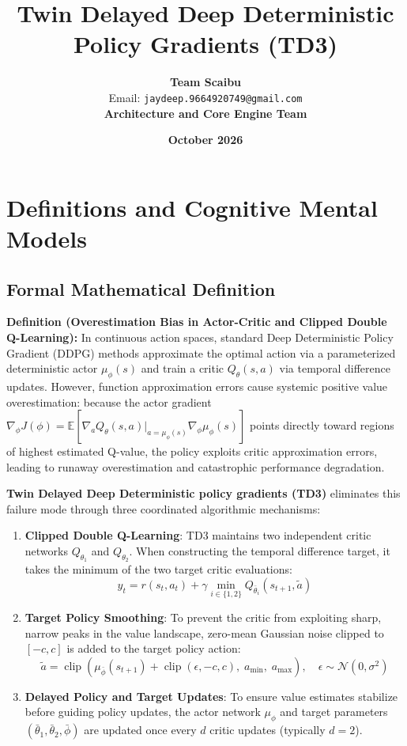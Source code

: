 \documentclass[11pt,a4paper]{article}
\title{\textbf{Twin Delayed Deep Deterministic Policy Gradients (TD3)}}
\author{\textbf{Team Scaibu} \\ \small Email: \texttt{jaydeep.9664920749@gmail.com} \\ \small \textbf{Architecture and Core Engine Team}}
\date{\textbf{October 2026}}
\theoremstyle{definition}
\begin{document}
\maketitle

\section{Definitions and Cognitive Mental Models}

\subsection{Formal Mathematical Definition}
\textbf{Definition (Overestimation Bias in Actor-Critic and Clipped Double Q-Learning):}
In continuous action spaces, standard Deep Deterministic Policy Gradient (DDPG) methods approximate the optimal action via a parameterized deterministic actor $\mu_\phi(s)$ and train a critic $Q_\theta(s, a)$ via temporal difference updates. However, function approximation errors cause systemic positive value overestimation: because the actor gradient $\nabla_\phi J(\phi) = \mathbb{E}[\nabla_a Q_\theta(s, a)|_{a=\mu_\phi(s)} \nabla_\phi \mu_\phi(s)]$ points directly toward regions of highest estimated Q-value, the policy exploits critic approximation errors, leading to runaway overestimation and catastrophic performance degradation.

\textbf{Twin Delayed Deep Deterministic policy gradients (TD3)} eliminates this failure mode through three coordinated algorithmic mechanisms:
\begin{enumerate}
    \item \textbf{Clipped Double Q-Learning}: TD3 maintains two independent critic networks $Q_{\theta_1}$ and $Q_{\theta_2}$. When constructing the temporal difference target, it takes the minimum of the two target critic evaluations:
    {\boldmath
    \begin{equation}
    y_t = r(s_t, a_t) + \gamma \min_{i \in \{1, 2\}} Q_{\bar{\theta}_i}(s_{t+1}, \tilde{a})
    \end{equation}
    }
    \item \textbf{Target Policy Smoothing}: To prevent the critic from exploiting sharp, narrow peaks in the value landscape, zero-mean Gaussian noise clipped to $[-c, c]$ is added to the target policy action:
    {\boldmath
    \begin{equation}
    \tilde{a} = \operatorname{clip}\left( \mu_{\bar{\phi}}(s_{t+1}) + \operatorname{clip}(\epsilon, -c, c), \; a_{\min}, \; a_{\max} \right), \quad \epsilon \sim \mathcal{N}(0, \sigma^2)
    \end{equation}
    }
    \item \textbf{Delayed Policy and Target Updates}: To ensure value estimates stabilize before guiding policy updates, the actor network $\mu_\phi$ and target parameters $(\bar{\theta}_1, \bar{\theta}_2, \bar{\phi})$ are updated once every $d$ critic updates (typically $d = 2$).
\end{enumerate}
\end{document}
